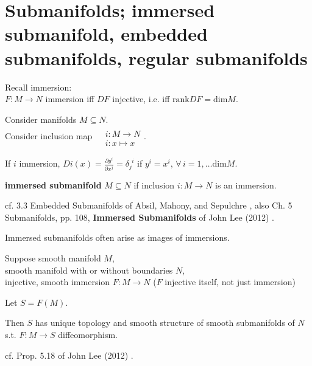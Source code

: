 \section{Submanifolds; immersed submanifold, embedded submanifolds, regular submanifolds}  

\begin{definition}
	
\end{definition}

Recall immersion:  \\
$F:M \to N$ immersion iff $DF$ injective, i.e. iff $\text{rank}DF = \text{dim}M$.  

Consider manifolds $M\subseteq N$.  \\
Consider inclusion map $\begin{aligned} & \quad \\ 
	& i:M\to N \\
	& i: x \mapsto x \end{aligned}$.  
	
	If $i$ immersion, $Di(x) = \frac{\partial y^i}{ \partial x^j} = \delta_j^{\  \  i}$ if $y^i = x^i$, $\forall \, i =1,\dots \text{dim}M$.  
	
\begin{definition}
	\textbf{immersed submanifold} $M \subseteq N$ if inclusion $i:M\to N$ is an immersion.  
\end{definition}	
cf. 3.3 Embedded Submanifolds of Absil, Mahony, and Sepulchre \cite{dgdt:AMS2008}, also Ch. 5 Submanifolds, pp. 108, \textbf{Immersed Submanifolds} of  John Lee (2012) \cite{dgdt:JLee2012}.  

Immersed submanifolds often arise as images of immersions.  

\begin{proposition}
	Suppose smooth manifold $M$, \\
	\phantom{Suppose } smooth manifold with or without boundaries $N$, \\
	injective, smooth immersion $F:M\to N$ ($F$ injective itself, not just immersion)  
	
Let $S=F(M)$.  

Then $S$ has unique topology and smooth structure of smooth submanifolds of $N$ s.t. $F:M\to S$ diffeomorphism.  
	
\end{proposition}
cf. Prop. 5.18 of John Lee (2012) \cite{dgdt:JLee2012}.  

